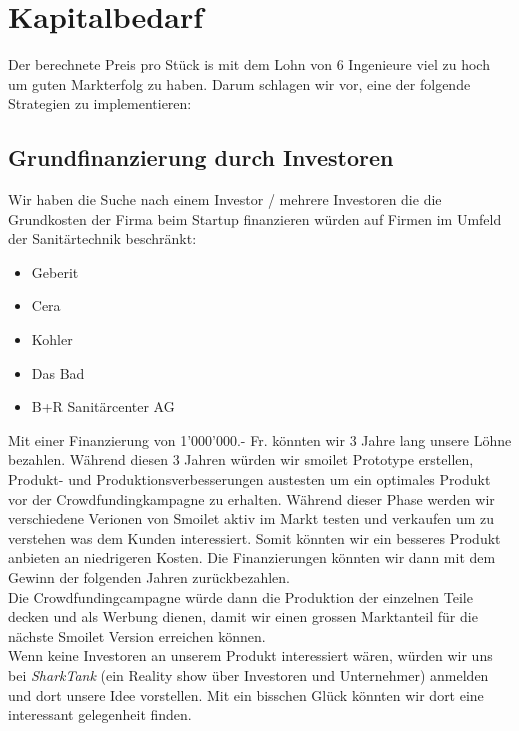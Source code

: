 \section{Kapitalbedarf}
Der berechnete Preis pro St\"uck is mit dem Lohn von 6 Ingenieure viel zu hoch um guten Markterfolg zu haben. Darum schlagen wir vor, eine der folgende Strategien zu implementieren:

\subsection{Grundfinanzierung durch Investoren}
Wir haben die Suche nach einem Investor / mehrere Investoren die die Grundkosten der Firma beim Startup finanzieren würden auf Firmen im Umfeld der Sanitärtechnik beschränkt:
\begin{itemize}
\item Geberit
\item Cera
\item Kohler
\item Das Bad
\item B+R Sanitärcenter AG
\end{itemize}
Mit einer Finanzierung von 1'000'000.- Fr. könnten wir 3 Jahre lang unsere L\"ohne bezahlen. Während diesen 3 Jahren würden wir smoilet Prototype erstellen, Produkt- und Produktionsverbesserungen austesten um ein optimales Produkt vor der Crowdfundingkampagne zu erhalten. Während dieser Phase werden wir verschiedene Verionen von Smoilet aktiv im Markt testen und verkaufen um zu verstehen was dem Kunden interessiert. Somit könnten wir ein besseres Produkt anbieten an niedrigeren Kosten. Die Finanzierungen könnten wir dann mit dem Gewinn der folgenden Jahren zurückbezahlen.\\
Die Crowdfundingcampagne würde dann die Produktion der einzelnen Teile decken und als Werbung dienen, damit wir einen grossen Marktanteil für die nächste Smoilet Version erreichen können. \\
Wenn keine Investoren an unserem Produkt interessiert wären, würden wir uns bei \textit{SharkTank} (ein Reality show über Investoren und Unternehmer) anmelden und dort unsere Idee vorstellen. Mit ein bisschen Glück könnten wir dort eine interessant gelegenheit finden.
